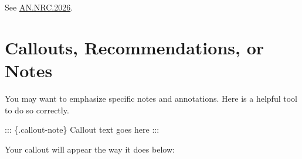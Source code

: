 \documentclass[
  letterpaper,
  oneside,
  openany]{scrbook}
\newenvironment{Shaded}{\begin{snugshade}}{\end{snugshade}}
\newcommand{\NormalTok}[1]{\textcolor[rgb]{0.00,0.23,0.31}{#1}}
\begin{document}
See \hyperref[eq-an-nrc-2026]{AN.NRC.2026}.

\section{Callouts, Recommendations, or
Notes}\label{callouts-recommendations-or-notes}

You may want to emphasize specific notes and annotations. Here is a
helpful tool to do so correctly.

\begin{Shaded}
\begin{Highlighting}[]
\NormalTok{::: \{.callout{-}note\}}
\NormalTok{Callout text goes here}
\NormalTok{:::}
\end{Highlighting}
\end{Shaded}

Your callout will appear the way it does below:
\end{document}

